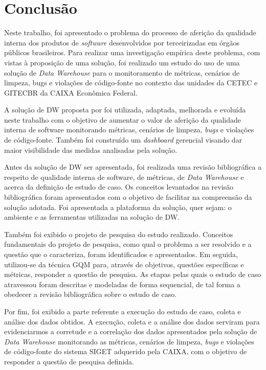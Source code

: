 \chapter{Conclusão}

Neste trabalho, foi apresentado o problema do processo de aferição da qualidade interna dos produtos de \textit{software} desenvolvidos por terceirizadas em órgãos públicos brasileiros. Para realizar uma investigação empírica deste problema, com vistas à proposição de uma solução, foi realizado um estudo do uso de uma solução de \textit{Data Warehouse} para o monitoramento de métricas, cenários de limpeza, bugs e violações de código-fonte no contexto das unidades da  CETEC e GITECBR da CAIXA Econômica Federal.

A solução de DW proposta por  foi utilizada, adaptada, melhorada e evoluída neste trabalho com o objetivo de aumentar o valor de aferição da qualidade interna de software monitorando métricas, cenários de limpeza, \textit{bugs} e violações de código-fonte. Também foi construído um \textit{dashboard} gerencial visando dar maior visibilidade das medidas analisadas pela solução.

Antes da solução de DW ser apresentada, foi realizada uma revisão bibliográfica a respeito de qualidade interna de software, de métricas, de \textit{Data Warehouse} e acerca da definição de estudo de caso. Os conceitos levantados na revisão bibliográfica foram apresentados com o objetivo de facilitar na compreensão da solução adotada. Foi apresentada a plataforma da solução, quer sejam: o ambiente e as ferramentas utilizadas na solução de DW. 

Também foi exibido o projeto de pesquisa do estudo realizado. Conceitos fundamentais do projeto de pesquisa, como qual o problema a ser resolvido e a questão que o caracteriza, foram identificados e apresentados. Em seguida, utilizou-se da  técnica GQM para, através de objetivos, questões específicas e métricas, responder a questão de pesquisa. As etapas pelas quais o estudo de caso atravessou foram descritas e modeladas de forma sequencial, de tal forma a obedecer a revisão bibliográfica sobre o estudo de caso.

Por fim, foi exibido a parte referente a execução do estudo de caso, coleta e análise dos dados obtidos. A execução, coleta e a análise dos dados serviram para evidenciarmos a corretude e a correlação dos dados apresentados pela solução de \textit{Data Warehouse} monitorando as métricas, cenários de limpeza, \textit{bugs} e violações de código-fonte do sistema SIGET adquerido pela CAIXA, com o objetivo de responder a questão de pesquisa definida.

